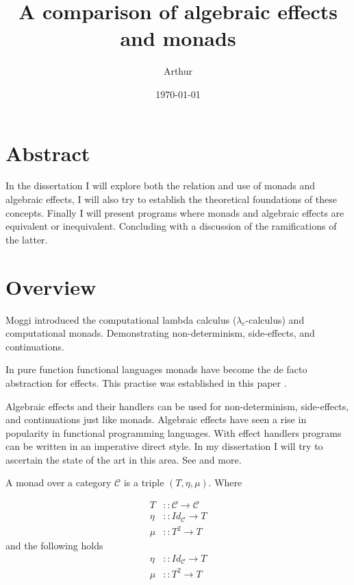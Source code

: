 \documentclass[a4paper,10pt]{article}
\title{A comparison of algebraic effects and monads}
\author{Arthur}
\date{\today}
\begin{document}
\maketitle
\section{Abstract}

In the dissertation I will explore both the relation and use of monads and algebraic effects,
I will also try to establish the theoretical foundations of these concepts.
Finally I will present programs where monads and algebraic effects are equivalent or
inequivalent. Concluding with a discussion of the ramifications of the latter.

\section{Overview}
Moggi \cite{Moggi:hc} introduced the computational lambda calculus (${\lambda}_c$-calculus)
and computational monads. Demonstrating non-determinism, side-effects, and continuations.

In pure function functional languages monads have become the de facto abstraction for effects.
This practise was established in this paper \cite{wadler1990}.

Algebraic effects \cite{plotkin2001adequacy} and their handlers \cite{Plotkin:2001jr}
can be used for non-determinism, side-effects, and continuations just like monads.
Algebraic effects have seen a rise in popularity in functional programming languages.
With effect handlers programs can be written in an imperative direct style.
In my dissertation I will try to ascertain the state of the art in this area.
See \cite{Bauer:2013fn, leijen:16, Lindley:2016vz, Dolan:2017} and more.

A monad over a category $\mathcal{C}$ is a triple $(T,\eta,\mu)$. Where

\begin{equation}
  \begin{split}
    T    &:: \mathcal{C} \rightarrow \mathcal{C} \\
    \eta &:: Id_{\mathcal{C}} \rightarrow T       \\
    \mu  &:: T^{2} \rightarrow T
  \end{split}
\end{equation}
and the following holds
\begin{equation}
  \begin{split}
    \eta &:: Id_{\mathcal{C}} \rightarrow T       \\
    \mu  &:: T^{2} \rightarrow T
  \end{split}
\end{equation}
\end{document}
